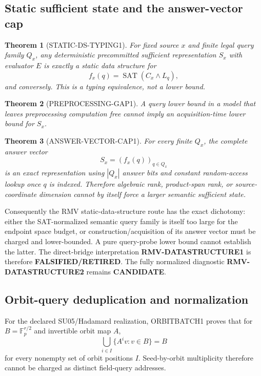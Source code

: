 \documentclass[11pt]{article}
\newcommand{\statusretired}{\textcolor{retired}{\textbf{FALSIFIED/RETIRED}}}
\newcommand{\statuscandidate}{\textcolor{candidate}{\textbf{CANDIDATE}}}
\theoremstyle{plain}
\newtheorem{theorem}{Theorem}[section]
\theoremstyle{definition}
\theoremstyle{remark}
\begin{document}
\subsection{Static sufficient state and the answer-vector cap}

\begin{theorem}[STATIC-DS-TYPING1]
For fixed source \(x\) and finite legal query family \(Q_x\), any
deterministic precommitted sufficient representation \(S_x\) with evaluator
\(E\) is exactly a static data structure for
\[
f_x(q)=\operatorname{SAT}(C_x\wedge L_q),
\]
and conversely. This is a typing equivalence, not a lower bound.
\end{theorem}

\begin{theorem}[PREPROCESSING-GAP1]
A query lower bound in a model that leaves preprocessing computation free
cannot imply an acquisition-time lower bound for \(S_x\).
\end{theorem}

\begin{theorem}[ANSWER-VECTOR-CAP1]
For every finite \(Q_x\), the complete answer vector
\[
S_x=(f_x(q))_{q\in Q_x}
\]
is an exact representation using \(|Q_x|\) answer bits and constant
random-access lookup once \(q\) is indexed. Therefore algebraic rank,
product-span rank, or source-coordinate dimension cannot by itself force a
larger semantic sufficient state.
\end{theorem}

Consequently the RMV static-data-structure route has the exact dichotomy:
either the SAT-normalized semantic query family is itself too large for the
endpoint space budget, or construction/acquisition of its answer vector must
be charged and lower-bounded. A pure query-probe lower bound cannot establish
the latter. The direct-bridge interpretation \textbf{RMV-DATASTRUCTURE1} is
therefore \statusretired. The fully normalized diagnostic
\textbf{RMV-DATASTRUCTURE2} remains \statuscandidate.

\subsection{Orbit-query deduplication and normalization}

For the declared SU05/Hadamard realization, ORBITBATCH1 proves that for
\(B=\mathbb F_p^{r/2}\) and invertible orbit map \(A\),
\[
\bigcup_{i\in I}\{A^iv:v\in B\}=B
\]
for every nonempty set of orbit positions \(I\). Seed-by-orbit multiplicity
therefore cannot be charged as distinct field-query addresses.
\end{document}

